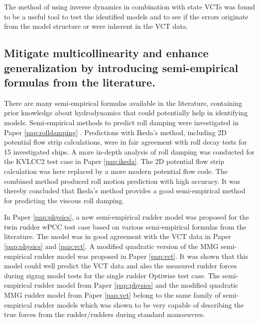 The method of using inverse dynamics in combination with state VCTs was found to be a useful tool to test the identified models and to see if the errors originate from the model structure or were inherent in the VCT data. 

\subsection*{Mitigate multicollinearity and enhance generalization by introducing semi-empirical formulas from the literature.}
There are many semi-empirical formulas available in the literature, containing prior knowledge about hydrodynamics that could potentially help in identifying models.       
Semi-empirical methods to predict roll damping were investigated in Paper \ref{pap:rolldamping} . Predictions with Ikeda's method, including 2D potential flow strip calculations, were in fair agreement with roll decay tests for 15 investigated ships. 
A more in-depth analysis of roll damping was conducted for the KVLCC2 test case in Paper \ref{pap:ikeda}. The 2D potential flow strip calculation was here replaced by a more modern potential flow code. The combined method produced roll motion prediction with high accuracy. It was thereby concluded that Ikeda's method provides a good semi-empirical method for predicting the viscous roll damping.

In Paper \ref{pap:physics}, a new semi-empirical rudder model was proposed for the twin rudder wPCC test case based on various semi-empirical formulas from the literature. The model was in good agreement with the VCT data in Paper \ref{pap:physics} and \ref{pap:vct}. 
A modified quadratic version of the MMG semi-empirical rudder model was proposed in Paper \ref{pap:vct}. 
It was shown that this model could well predict the VCT data and also the measured rudder forces during zigzag model tests for the single rudder Optiwise test case. 
The semi-empirical rudder model from Paper \ref{pap:physics} and the modified quadratic MMG rudder model from Paper \ref{pap:vct} belong to the same family of semi-empirical rudder models which was shown to be very capable of describing the true forces from the rudder/rudders during standard manoeuvres.  